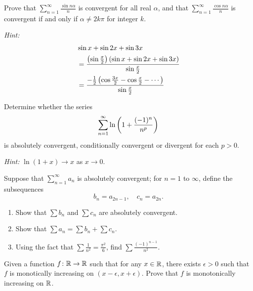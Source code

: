 \begin{exercise}
Prove that $\sum_{n=1}^\infty\frac{\sin n\alpha}{n}$ is convergent for all real $\alpha$, and that $\sum_{n=1}^\infty\frac{\cos n\alpha}{n}$ is convergent if and only if $\alpha\neq2k\pi$ for integer $k$.

\emph{Hint:}
\begin{align*}
&\sin x+\sin 2x+\sin 3x\\
&=\frac{\left(\sin\frac{x}{2}\right)\left(\sin x+\sin2x+\sin3x\right)}{\sin\frac{x}{2}}\\
&=\frac{-\frac{1}{2}\left(\cos\frac{3x}{2}-\cos\frac{x}{2}-\cdots\right)}{\sin\frac{x}{2}}
\end{align*}
\end{exercise}

\begin{exercise}
Determine whether the series
\[\sum_{n=1}^{\infty}\ln\left(1+\frac{(-1)^n}{n^p}\right)\]
is absolutely convergent, conditionally convergent or divergent for each $p>0$.

\emph{Hint:} $\ln(1+x)\to x$ as $x\to0$.
\end{exercise}

\begin{exercise}
Suppose that $\sum_{n=1}^\infty a_n$ is absolutely convergent; for $n=1$ to $\infty$, define the subsequences
\[b_n=a_{2n-1},\quad c_n=a_{2n}.\]
\begin{enumerate}[label=(\roman*)]
\item Show that $\sum b_n$ and $\sum c_n$ are absolutely convergent.
\item Show that $\sum a_n=\sum b_n+\sum c_n$.
\item Using the fact that $\sum\frac{1}{n^2}=\frac{\pi^2}{6}$, find $\sum\frac{(-1)^{n-1}}{n^2}$.
\end{enumerate}
\end{exercise}

\begin{exercise}
Given a function $f\colon\mathbb R\to\mathbb R$ such that for any $x\in\mathbb R$, there exists $\epsilon>0$ such that $f$ is monotically increasing on $(x-\epsilon,x+\epsilon)$. Prove that $f$ is monotonically increasing on $\mathbb R$.
\end{exercise}
